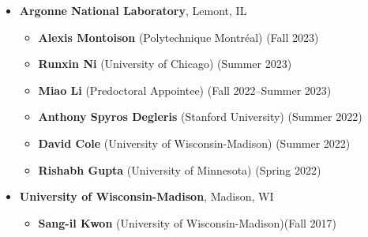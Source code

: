 \begin{itemize}[itemsep=1pt, parsep=0pt,leftmargin=*]
\begin{itemize}[itemsep=1pt, parsep=0pt,leftmargin=*]
    \item[] \textbf{Chun Wai Fung} (Visiting Student; Imperial College London) \hfill (Summer 2024)
  \end{itemize}
\item[] \textbf{Argonne National Laboratory}, Lemont, IL
  \begin{itemize}[itemsep=1pt, parsep=0pt,leftmargin=*]
  \item[] \textbf{Alexis Montoison} (Polytechnique Montr\'{e}al) \hfill (Fall 2023)
  \item[] \textbf{Runxin Ni} (University of Chicago) \hfill (Summer 2023)
  \item[] \textbf{Miao Li} (Predoctoral Appointee) \hfill (Fall 2022--Summer 2023)
  \item[] \textbf{Anthony Spyros Degleris} (Stanford University) \hfill (Summer 2022)
  \item[] \textbf{David Cole} (University of Wisconsin-Madison) \hfill (Summer 2022)
  \item[] \textbf{Rishabh Gupta} (University of Minnesota) \hfill (Spring 2022)
  \end{itemize}
\item[] \textbf{University of Wisconsin-Madison}, Madison, WI
  \begin{itemize}[itemsep=1pt, parsep=0pt,leftmargin=*]
  \item[] \textbf{Sang-il Kwon} (University of Wisconsin-Madison)\hfill (Fall 2017)
  \end{itemize}
\end{itemize}

